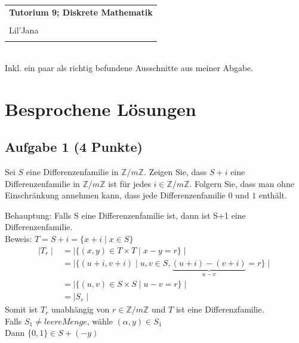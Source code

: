 \documentclass{article} %
\newcommand{\titulo}{Tutorium 9; Diskrete Mathematik}
\newcommand{\nombre}{Lil'Jana}
\begin{document}
\begin{tabular}{p{12cm}}
{{\Large\bf\titulo}}\\
\vspace{0.2cm}\\
 {\large\nombre}\\
 \vspace{0.1cm}
\end{tabular} \\
Inkl. ein paar als richtig befundene Ausschnitte aus meiner Abgabe. 
\section*{Besprochene Lösungen}

\subsection*{Aufgabe 1 (4 Punkte)}
Sei $S$ eine Differenzenfamilie in $\mathbb{Z}/m\mathbb{Z}$. Zeigen Sie, dass $S + i$ eine Differenzenfamilie in $\mathbb{Z}/m\mathbb{Z}$ ist für jedes $i \in \mathbb{Z}/m\mathbb{Z}$. Folgern Sie, dass man ohne Einschränkung annehmen kann, dass jede Differenzenfamilie $0$ und $1$ enthält.
\begin{mybox}
 Behauptung: Falls S eine Differenzenfamilie ist, dann ist S+1 eine Differenzenfamilie. \\
 Beweis: $T = S+i = \{x+i \mid x \in S\}$ \\
\begin{align*}
    \mid T_r \mid & = \mid \{(x,y) \in T \times T \mid x-y = r\}\mid  \\
    & = \mid \{ (u+i, v+i) \mid u,v \in S , \underbrace{(u+i) - (v+i) }_{u-v} = r \} \mid \\
    & = \mid \{ (u,v) \in S \times S \mid u-v = r \}\mid \\
     & = \mid S_r \mid 
\end{align*}
Somit ist $T_r$ unabhängig von $r \in \mathbb{Z}/m\mathbb{Z}$ und $T$ ist eine Differenzfamilie. \\ \newline
Falls $S_1 \neq leere Menge$, wähle $(\alpha, y) \in S_1$ \\
Dann $\{0,1\} \in S+ (-y)$
\end{mybox}
\end{document}

